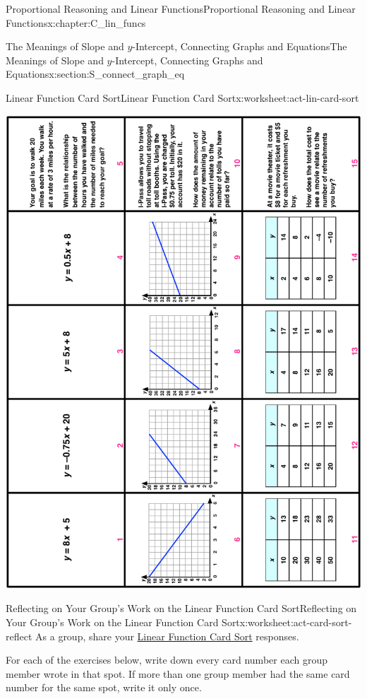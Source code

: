 \documentclass[oneside,10pt,]{book}
\numberwithin{equation}{chapter}
\begin{document}
\begin{chapterptx}{Proportional Reasoning and Linear Functions}{}{Proportional Reasoning and Linear Functions}{}{}{x:chapter:C_lin_funcs}
\begin{sectionptx}{The Meanings of Slope and \(y\)-Intercept, Connecting Graphs and Equations}{}{The Meanings of Slope and \(y\)-Intercept, Connecting Graphs and Equations}{}{}{x:section:S_connect_graph_eq}
\begin{worksheet-subsection}{Linear Function Card Sort}{}{Linear Function Card Sort}{}{}{x:worksheet:act-lin-card-sort}
\begin{image}{0}{1}{0}
\includegraphics[width=\linewidth]{external/lin-card-sort-cards.pdf}
\end{image}%
\end{worksheet-subsection}
\restoregeometry
%
%
\typeout{************************************************}
\typeout{************************************************}
%
\begin{worksheet-subsection}{Reflecting on Your Group's Work on the Linear Function Card Sort}{}{Reflecting on Your Group's Work on the Linear Function Card Sort}{}{}{x:worksheet:act-card-sort-reflect}
As a group, share your \hyperref[x:worksheet:act-lin-card-sort]{Linear Function Card Sort} responses.%
\par
For each of the exercises below, write down every card number each group member wrote in that spot. If more than one group member had the same card number for the same spot, write it only once.%

\end{worksheet-subsection}
\end{sectionptx}
\end{chapterptx}
\end{document}
